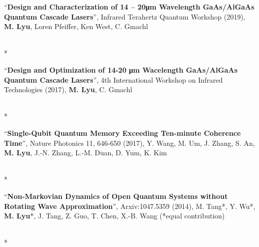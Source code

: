 \documentclass[localFont,alternative]{yaac-another-awesome-cv}
\begin{document}
\newcommand\publication[3]{
  \begin{minipage}[t]{\dimexpr(\linewidth) - 1.5em}
    ``\textbf{#1}'', #2, #3
  \end{minipage}
  \\*
}
\publication{Design and Characterization of 14 – 20μm Wavelength GaAs/AlGaAs
Quantum Cascade Lasers}{Infrared Terahertz Quantum Workshop (2019)}
{\textbf{M. Lyu}, Loren Pfeiffer, Ken West, C. Gmachl}
\publication{Design and Optimization of 14-20 μm Wacelength GaAs/AlGaAs 
  Quantum Cascade Lasers}{4th International Workshop on Infrared
  Technologies (2017)}{\textbf{M. Lyu}, C. Gmachl}
\publication{Single-Qubit Quantum Memory Exceeding Ten-minute Coherence Time}
  {Nature Photonics 11, 646-650 (2017)}{Y. Wang, M. Um, J. Zhang, S. An, 
    \textbf{M. Lyu}, J.-N. Zhang, L.-M. Duan, D. Yum, K. Kim}
\publication{Non-Markovian Dynamics of Open Quantum Systems without Rotating 
  Wave Approximation}{Arxiv:1047.5359 (2014)}{M. Tang*, Y. Wu*, 
  \textbf{M. Lyu}*, J. Tang, Z. Guo, T. Chen, X.-B. Wang 
  (*equal contribution)}
\end{document}
